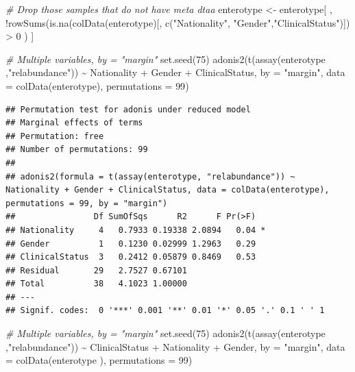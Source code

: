 \documentclass[
]{book}
\newenvironment{Shaded}{\begin{snugshade}}{\end{snugshade}}
\newcommand{\AttributeTok}[1]{\textcolor[rgb]{0.77,0.63,0.00}{#1}}
\newcommand{\CommentTok}[1]{\textcolor[rgb]{0.56,0.35,0.01}{\textit{#1}}}
\newcommand{\DecValTok}[1]{\textcolor[rgb]{0.00,0.00,0.81}{#1}}
\newcommand{\FunctionTok}[1]{\textcolor[rgb]{0.00,0.00,0.00}{#1}}
\newcommand{\NormalTok}[1]{#1}
\newcommand{\OtherTok}[1]{\textcolor[rgb]{0.56,0.35,0.01}{#1}}
\newcommand{\SpecialCharTok}[1]{\textcolor[rgb]{0.00,0.00,0.00}{#1}}
\newcommand{\StringTok}[1]{\textcolor[rgb]{0.31,0.60,0.02}{#1}}
\begin{document}
\begin{Shaded}
\begin{Highlighting}[]
\CommentTok{\# Drop those samples that do not have meta dtaa}
\NormalTok{enterotype }\OtherTok{\textless{}{-}} 
\NormalTok{    enterotype[ , }\SpecialCharTok{!}\FunctionTok{rowSums}\NormalTok{(}\FunctionTok{is.na}\NormalTok{(}\FunctionTok{colData}\NormalTok{(enterotype)[, }\FunctionTok{c}\NormalTok{(}\StringTok{"Nationality"}\NormalTok{, }\StringTok{"Gender"}\NormalTok{,}\StringTok{"ClinicalStatus"}\NormalTok{)]) }\SpecialCharTok{\textgreater{}} \DecValTok{0}\NormalTok{ ) ]}

\CommentTok{\# Multiple variables, by = "margin"}
\FunctionTok{set.seed}\NormalTok{(}\DecValTok{75}\NormalTok{)}
\FunctionTok{adonis2}\NormalTok{(}\FunctionTok{t}\NormalTok{(}\FunctionTok{assay}\NormalTok{(enterotype ,}\StringTok{"relabundance"}\NormalTok{)) }\SpecialCharTok{\textasciitilde{}}\NormalTok{ Nationality }\SpecialCharTok{+}\NormalTok{ Gender }\SpecialCharTok{+}\NormalTok{ ClinicalStatus,}
        \AttributeTok{by =} \StringTok{"margin"}\NormalTok{,}
        \AttributeTok{data =} \FunctionTok{colData}\NormalTok{(enterotype),}
        \AttributeTok{permutations =} \DecValTok{99}\NormalTok{)}
\end{Highlighting}
\end{Shaded}

\begin{verbatim}
## Permutation test for adonis under reduced model
## Marginal effects of terms
## Permutation: free
## Number of permutations: 99
## 
## adonis2(formula = t(assay(enterotype, "relabundance")) ~ Nationality + Gender + ClinicalStatus, data = colData(enterotype), permutations = 99, by = "margin")
##                Df SumOfSqs      R2      F Pr(>F)  
## Nationality     4   0.7933 0.19338 2.0894   0.04 *
## Gender          1   0.1230 0.02999 1.2963   0.29  
## ClinicalStatus  3   0.2412 0.05879 0.8469   0.53  
## Residual       29   2.7527 0.67101                
## Total          38   4.1023 1.00000                
## ---
## Signif. codes:  0 '***' 0.001 '**' 0.01 '*' 0.05 '.' 0.1 ' ' 1
\end{verbatim}

\begin{Shaded}
\begin{Highlighting}[]
\CommentTok{\# Multiple variables, by = "margin"}
\FunctionTok{set.seed}\NormalTok{(}\DecValTok{75}\NormalTok{)}
\FunctionTok{adonis2}\NormalTok{(}\FunctionTok{t}\NormalTok{(}\FunctionTok{assay}\NormalTok{(enterotype ,}\StringTok{"relabundance"}\NormalTok{)) }\SpecialCharTok{\textasciitilde{}}\NormalTok{ ClinicalStatus }\SpecialCharTok{+}\NormalTok{ Nationality }\SpecialCharTok{+}\NormalTok{ Gender,}
        \AttributeTok{by =} \StringTok{"margin"}\NormalTok{,}
        \AttributeTok{data =} \FunctionTok{colData}\NormalTok{(enterotype ),}
        \AttributeTok{permutations =} \DecValTok{99}\NormalTok{)}
\end{Highlighting}
\end{Shaded}
\end{document}
